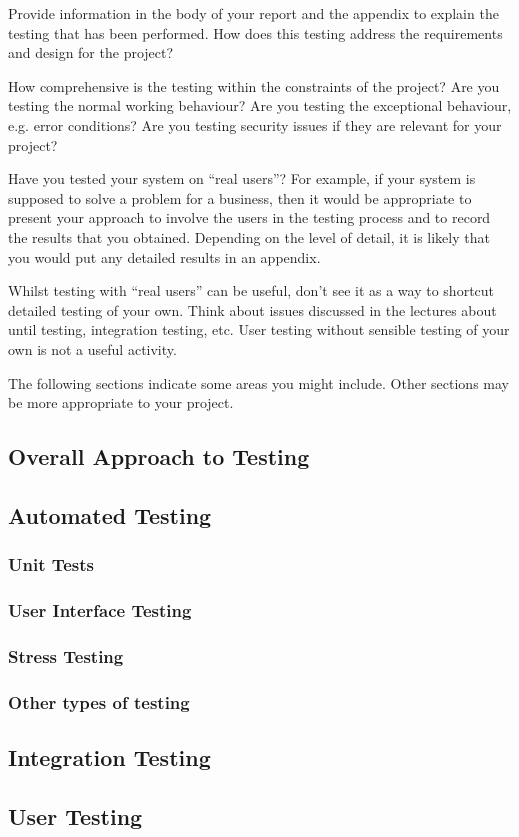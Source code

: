 Provide information in the body of your report and the appendix to explain the testing that has been performed. How does this testing address the requirements and design for the project?

How comprehensive is the testing within the constraints of the project?  Are you testing the normal working behaviour? Are you testing the exceptional behaviour, e.g. error conditions? Are you testing security issues if they are relevant for your project?

Have you tested your system on ``real users''? For example, if your system is supposed to solve a problem for a business, then it would be appropriate to present your approach to involve the users in the testing process and to record the results that you obtained. Depending on the level of detail, it is likely that you would put any detailed results in an appendix. 

Whilst testing with ``real users'' can be useful, don't see it as a way to shortcut detailed testing of your own. Think about issues discussed in the lectures about until testing, integration testing, etc. User testing without sensible testing of your own is not a useful activity.

The following sections indicate some areas you might include. Other sections may be more appropriate to your project. 

\subsection{Overall Approach to Testing}

\subsection{Automated Testing}

\subsubsection{Unit Tests}

\subsubsection{User Interface Testing}

\subsubsection{Stress Testing}

\subsubsection{Other types of testing}

\subsection{Integration Testing}

\subsection{User Testing}

